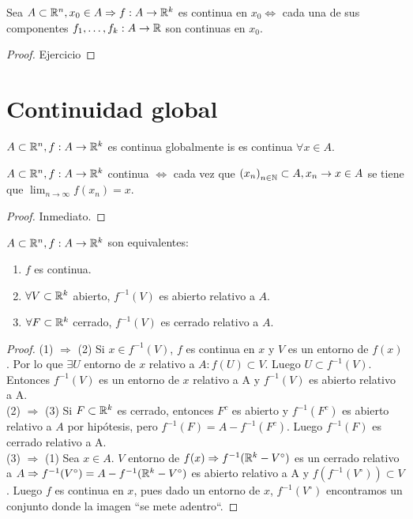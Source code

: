 \begin{prop}
  Sea \(A \subset \mathbb{R}^n, x_0 \in A \Rightarrow f: A \to \mathbb{R}^k\) es continua en \(x_0 \iff \) cada una de sus componentes \(f_1, \ldots, f_k: A \to \mathbb{R} \) son continuas en \(x_0\).
  \begin{proof}
    Ejercicio
  \end{proof}
\end{prop}

\section{Continuidad global}

\begin{definition}
  \(A \subset \mathbb{R}^n, f: A \to \mathbb{R}^k\) es continua globalmente is es continua \(\forall x \in A\).
\end{definition}

\begin{prop}
  \(A \subset \mathbb{R}^n, f: A \to \mathbb{R}^k\) continua \(\iff \) cada vez que \({(x_n)}_{n \in \mathbb{N}} \subset A, x_n \to x \in A\) se tiene que \(\lim_{n \to \infty} f(x_n) = x\).
  \begin{proof}
    Inmediato.
  \end{proof}
\end{prop}

\begin{prop}
  \(A \subset \mathbb{R}^n, f: A \to \mathbb{R}^k\) son equivalentes:
  \begin{enumerate}
    \item \(f\) es continua.
    \item \(\forall V \subset \mathbb{R}^k\) abierto, \(f^{-1}(V)\) es abierto relativo a \(A\).
    \item \(\forall F \subset \mathbb{R}^k\) cerrado, \(f^{-1}(V)\) es cerrado relativo a \(A\).
  \end{enumerate}
  \begin{proof}
    (1) \(\Rightarrow \) (2)  Si \(x \in f^{-1}(V)\), \(f\) es continua en \(x\) y \(V\) es un entorno de \(f(x)\). Por lo que \(\exists U\) entorno de \(x\) relativo a \(A : f(U) \subset V\). Luego \(U \subset f^{-1}(V)\). Entonces \(f^{-1}(V)\) es un entorno de \(x\) relativo a A y \(f^{-1}(V)\) es abierto relativo a A. \\
    (2) \(\Rightarrow \) (3) Si \(F \subset \mathbb{R}^k\) es cerrado, entonces \(F^c\) es abierto y \(f^{-1}(F^c)\) es abierto relativo a \(A\) por hipótesis, pero \(f^{-1}(F) = A - f^{-1}(F^c)\). Luego \(f^{-1}(F)\) es cerrado relativo a A. \\
    (3) \(\Rightarrow \) (1) Sea \(x \in A\). \(V\) entorno de \(f(x) \Rightarrow f^{-1}(\mathbb{R}^k - V^{\circ})\) es un cerrado relativo a \(A \Rightarrow f^{-1}(V^{\circ}) = A - f^{-1}(\mathbb{R}^k - V^{\circ})\) es abierto relativo a A y \(f(f^{-1}(V^{\circ})) \subset V\). Luego \(f\) es continua en \(x\), pues dado un entorno de \(x\), \(f^{-1}(V^{\circ})\) encontramos un conjunto donde la imagen ``se mete adentro``.
  \end{proof}
\end{prop}

